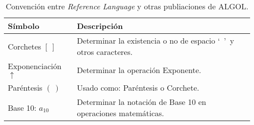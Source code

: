 \begin{table}[h]

\begin{center}

\begin{tabular}{|l|l|}\hline
\textbf{Símbolo} & \textbf{Descripción} \\ \hline
\hline
Corchetes $[\ ]$ & Determinar la existencia o no de espacio `\ '\ y otros caracteres. \\ \hline
Exponenciación $\uparrow$ & Determinar la operación Exponente. \\ \hline
Paréntesis $(\ )$ & Usado como: Paréntesis o Corchete. \\ \hline
Base 10: $a_{10}$ & Determinar la notación de Base 10 en operaciones matemáticas. \\ \hline
\end{tabular}

\caption{Convención entre \textit{Reference Language} y otras publiaciones de ALGOL.}

\end{center}

\end{table}